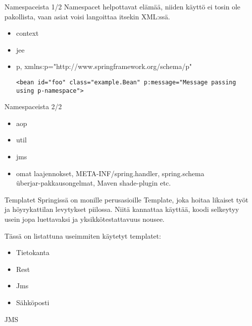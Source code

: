 \documentclass[hyperref={pdfauthor=\AUTHOR},14pt]{beamer}
\author{\AUTHOR}
\title[\TITLE]{\TITLE}
\date{\DATE}
\begin{document}
\begin{frame}[plain]
\titlepage
\end{frame}

\begin{frame}[t, fragile]{Namespaceista 1/2}
Namespacet helpottavat elämää, niiden käyttö ei tosin ole pakollista,
vaan asiat voisi langoittaa itsekin XML:ssä.
\begin{itemize}
\item context
\item jee
\item p, xmlns:p="http://www.springframework.org/schema/p"\\
\begin{lstlisting}
<bean id="foo" class="example.Bean" p:message="Message passing using p-namespace">
\end{lstlisting}
\end{itemize}
\end{frame}

\begin{frame}[t, fragile]{Namespaceista 2/2}
\begin{itemize}
\item aop
\item util
\item jms
\item omat laajennokset, META-INF/spring.handler, spring.schema\\
überjar-pakkausongelmat, Maven shade-plugin etc.
\end{itemize}
\end{frame}

\begin{frame}{Templatet}
Springissä on monille perusasioille Template, joka hoitaa likaiset työt ja höyrykattilan levytykset piilossa. Niitä kannattaa käyttää, koodi selkeytyy usein jopa luettavaksi ja yksikkötestattavuus nousee.

Tässä on listattuna useimmiten käytetyt templatet:
\begin{itemize}
\item Tietokanta
\item Rest
\item Jms
\item Sähköposti
\end{itemize}
\end{frame}

\begin{frame}{JMS}
\end{frame}
\end{document}

